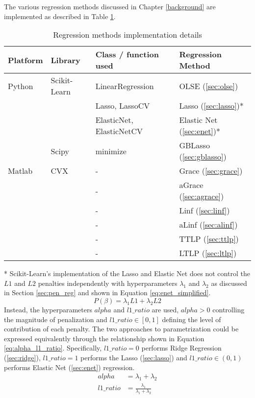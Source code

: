 The various regression methods discussed in Chapter \ref{background} are implemented as described in Table \ref{tab:method_impl}.
{\def\arraystretch{1.5}\tabcolsep=10pt
\begin{table}[ht]
	\label{tab:method_impl}
	\caption{Regression methods implementation details}
	\centering
	\begin{tabular}{l l l l}
		\hline\hline 
		Platform & Library & Class / function used & Regression Method \\
		\hline
		Python 	& 	Scikit-Learn	&	LinearRegression			&	OLSE (\ref{sec:olse})			\\
				&					&	Lasso, LassoCV 				&	Lasso (\ref{sec:lasso})*		\\
				&					&	ElasticNet, ElasticNetCV	&	Elastic Net (\ref{sec:enet})*	\\
				&	Scipy			&	minimize					&	GBLasso (\ref{sec:gblasso})		\\
		Matlab	&	CVX				&	-							&	Grace (\ref{sec:grace})			\\
				&					&	-							&	aGrace (\ref{sec:agrace})		\\
				&					&	-							&	Linf (\ref{sec:linf})			\\
				&					&	-							&	aLinf (\ref{sec:alinf})			\\
				&					&	-							&	TTLP (\ref{sec:ttlp})			\\
				&					&	-							&	LTLP (\ref{sec:ltlp})			\\
		\hline
	\end{tabular}
\end{table}

}

* Scikit-Learn's implementation of the Lasso and Elastic Net does not control the $L1$ and $L2$ penalties independently with hyperparameters $\lambda_1$ and $\lambda_2$ as discussed in Section \ref{sec:pen_reg} and shown in Equation \ref{eq:enet_simplified}.
\begin{equation} \label{eq:enet_simplified}
P(\beta) = \lambda_1L1 + \lambda_2L2
\end{equation} 
Instead, the hyperparameters $alpha$ and $l1\_ratio$ are used, $alpha>0$ controlling the magnitude of penalization and $l1\_ratio \in [0,1]$ defining the level of contribution of each penalty. The two approaches to parametrization could be expressed equivalently through the relationship shown in Equation \ref{eq:alpha_l1_ratio}. Specifically, $l1\_ratio=0$ performs Ridge Regression (\ref{sec:ridge}), $l1\_ratio=1$ performs the Lasso (\ref{sec:lasso})  and $l1\_ratio \in (0,1)$ performs Elastic Net (\ref{sec:enet}) regression.
\begin{equation} \label{eq:alpha_l1_ratio}
\begin{aligned} 
alpha		&=	\lambda_1+\lambda_2 \\
l1\_ratio	&=	\frac{\lambda_1}{\lambda_1+\lambda_2}
\end{aligned}
\end{equation}